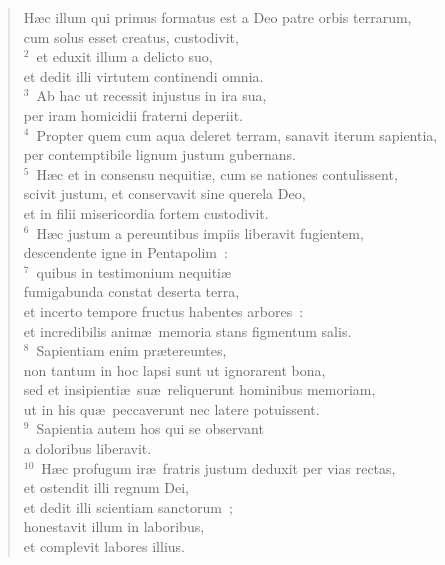 \begin{flushleft}\begin{verse}\vspace{-19pt}\hspace{6pt}H\ae c illum qui primus formatus est a Deo patre orbis terrarum,\\\hspace{6pt} cum solus esset creatus, custodivit,\\
${}^{2}$~et eduxit illum a delicto suo,\\ et dedit illi virtutem continendi omnia.\\
${}^{3}$~Ab hac ut recessit injustus in ira sua,\\ per iram homicidii fraterni deperiit.\\
${}^{4}$~Propter quem cum aqua deleret terram, sanavit iterum sapientia,\\ per contemptibile lignum justum gubernans.\\
${}^{5}$~H\ae c et in consensu nequiti\ae , cum se nationes contulissent,\\ scivit justum, et conservavit sine querela Deo,\\ et in filii misericordia fortem custodivit.\\
${}^{6}$~H\ae c justum a pereuntibus impiis liberavit fugientem,\\ descendente igne in Pentapolim~:\\
${}^{7}$~quibus in testimonium nequiti\ae \\ fumigabunda constat deserta terra,\\ et incerto tempore fructus habentes arbores~:\\ et incredibilis anim\ae\ memoria stans figmentum salis.\\
${}^{8}$~Sapientiam enim pr\ae tereuntes,\\ non tantum in hoc lapsi sunt ut ignorarent bona,\\ sed et insipienti\ae\ su\ae\ reliquerunt hominibus memoriam,\\ ut in his qu\ae\ peccaverunt nec latere potuissent.\\
${}^{9}$~Sapientia autem hos qui se observant\\ a doloribus liberavit.\\
${}^{10}$~H\ae c profugum ir\ae\ fratris justum deduxit per vias rectas,\\ et ostendit illi regnum Dei,\\ et dedit illi scientiam sanctorum~;\\ honestavit illum in laboribus,\\ et complevit labores illius.\\

\end{verse}
\end{flushleft}
